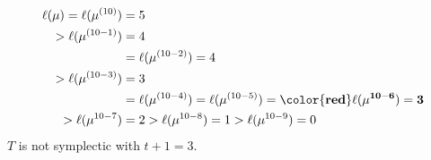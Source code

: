 \documentclass[reqno]{amsart}
\theoremstyle{tplain}
\newcommand{\YT}[3]{
\vcenter{\hbox{
\begin{tikzpicture}[x={(0in,-#1)},y={(#1,0in)}] %
\foreach \rowi [count=\i] in {#3} {
 \foreach \e [count=\j] in \rowi {
  \draw (\i,\j) rectangle +(-1,-1);
  \draw (\i-0.5,\j-0.5) node {$#2\e$};
 }
}
\end{tikzpicture}
}}
}
\begin{document}
{\begin{enumerate}
\begin{align}\ell(\mu)=\ell(\mu^{(10)})&=5\nonumber\\
>\ell(\mu^{(10-1)})&=4\nonumber\\
&=\ell(\mu^{(10-2)})=4\nonumber\\
  >\ell(\mu^{(10-3)})&=3\nonumber\\
  &=\ell(\mu^{(10-4)})=\ell(\mu^{(10-5)})=\mathbf{\color{red}\ell(\mu^{10-6})=3}\\
  >\ell(\mu^{10-7})&=2>\ell(\mu^{10-8})=1>\ell(\mu^{10-9})=0\nonumber
  \end{align}
$T$ is not symplectic with $t+1=3$.

  \end{enumerate}
\iffalse
}
\end{document}
